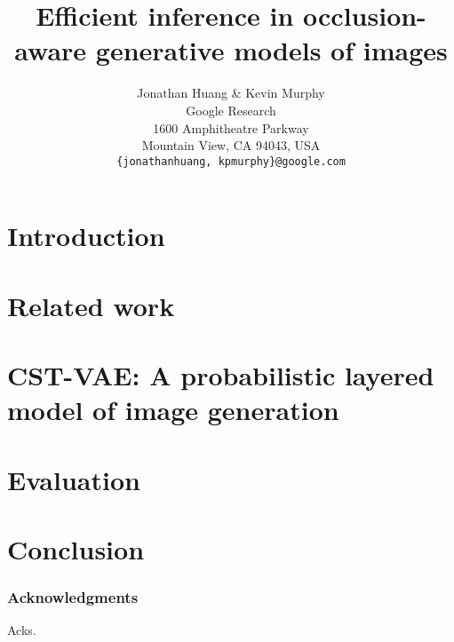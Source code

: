 \documentclass{article} %
\title{Efficient inference in occlusion-aware generative models of images}
\author{Jonathan Huang \& Kevin Murphy \\
Google Research \\
1600 Amphitheatre Parkway \\
Mountain View, CA 94043, USA\\
\texttt{\{jonathanhuang, kpmurphy\}@google.com}
}
\begin{document}
\maketitle



\section{Introduction}


\section{Related work}


\section{CST-VAE: A probabilistic layered model of image generation}


\section{Evaluation}


\section{Conclusion}


%

\subsubsection*{Acknowledgments}

Acks.




\end{document}
